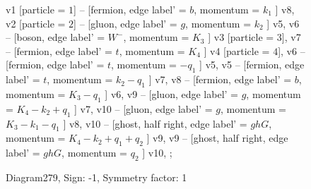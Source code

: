 \documentclass{revtex4}
\begin{document}
\begin{figure}[!htb]
\begin{center}
{    %
v1 [particle = \(1\)] -- [fermion, edge label' = \(b\), momentum = \(k_{1}\) ] v8, 
v2 [particle = \(2\)] -- [gluon, edge label' = \(g\), momentum = \(k_{2}\) ] v5, 
v6 -- [boson, edge label' = \(W^{-}\), momentum = \(K_{3}\) ] v3 [particle = \(3\)], 
v7 -- [fermion, edge label' = \(t\), momentum = \(K_{4}\) ] v4 [particle = \(4\)], 
v6 -- [fermion, edge label' = \(t\), momentum = \(-q_{1}\) ] v5, 
v5 -- [fermion, edge label' = \(t\), momentum = \(k_{2} - q_{1}\) ] v7, 
v8 -- [fermion, edge label' = \(b\), momentum = \(K_{3} - q_{1}\) ] v6, 
v9 -- [gluon, edge label' = \(g\), momentum = \(K_{4} - k_{2} + q_{1}\) ] v7, 
v10 -- [gluon, edge label' = \(g\), momentum = \(K_{3} - k_{1} - q_{1}\) ] v8, 
v10 -- [ghost, half right, edge label' = \(ghG\), momentum = \(K_{4} - k_{2} + q_{1} + q_{2}\) ] v9, 
v9 -- [ghost, half right, edge label' = \(ghG\), momentum = \(q_{2}\) ] v10, 
};
\end{center}
\caption{Diagram279, Sign: -1, Symmetry factor: 1}
\end{figure}
\newpage
\end{document}
